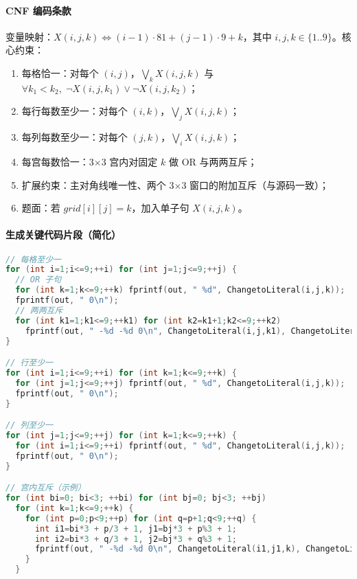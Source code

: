 \documentclass[UTF8]{ctexart}
\begin{document}
\paragraph{CNF 编码条款}
变量映射：\(X(i,j,k) \Leftrightarrow (i{-}1)\cdot 81 + (j{-}1)\cdot 9 + k\)，其中 \(i,j,k\in\{1..9\}\)。核心约束：
\begin{enumerate}
  \item 每格恰一：对每个 \((i,j)\)，\(\bigvee_k X(i,j,k)\) 与 \(\forall k_1<k_2,\; \lnot X(i,j,k_1)\lor\lnot X(i,j,k_2)\)；
  \item 每行每数至少一：对每个 \((i,k)\)，\(\bigvee_j X(i,j,k)\)；
  \item 每列每数至少一：对每个 \((j,k)\)，\(\bigvee_i X(i,j,k)\)；
  \item 每宫每数恰一：3\(\times\)3 宫内对固定 \(k\) 做 OR 与两两互斥；
  \item 扩展约束：主对角线唯一性、两个 3\(\times\)3 窗口的附加互斥（与源码一致）；
  \item 题面：若 \(grid[i][j]=k\)，加入单子句 \(X(i,j,k)\)。
\end{enumerate}

\paragraph{生成关键代码片段（简化）}
\begin{lstlisting}[language=C]
// 每格至少一
for (int i=1;i<=9;++i) for (int j=1;j<=9;++j) {
  // OR 子句
  for (int k=1;k<=9;++k) fprintf(out, " %d", ChangetoLiteral(i,j,k));
  fprintf(out, " 0\n");
  // 两两互斥
  for (int k1=1;k1<=9;++k1) for (int k2=k1+1;k2<=9;++k2)
    fprintf(out, " -%d -%d 0\n", ChangetoLiteral(i,j,k1), ChangetoLiteral(i,j,k2));
}

// 行至少一
for (int i=1;i<=9;++i) for (int k=1;k<=9;++k) {
  for (int j=1;j<=9;++j) fprintf(out, " %d", ChangetoLiteral(i,j,k));
  fprintf(out, " 0\n");
}

// 列至少一
for (int j=1;j<=9;++j) for (int k=1;k<=9;++k) {
  for (int i=1;i<=9;++i) fprintf(out, " %d", ChangetoLiteral(i,j,k));
  fprintf(out, " 0\n");
}

// 宫内互斥（示例）
for (int bi=0; bi<3; ++bi) for (int bj=0; bj<3; ++bj)
  for (int k=1;k<=9;++k) {
    for (int p=0;p<9;++p) for (int q=p+1;q<9;++q) {
      int i1=bi*3 + p/3 + 1, j1=bj*3 + p%3 + 1;
      int i2=bi*3 + q/3 + 1, j2=bj*3 + q%3 + 1;
      fprintf(out, " -%d -%d 0\n", ChangetoLiteral(i1,j1,k), ChangetoLiteral(i2,j2,k));
    }
  }
\end{lstlisting}
\end{document}
